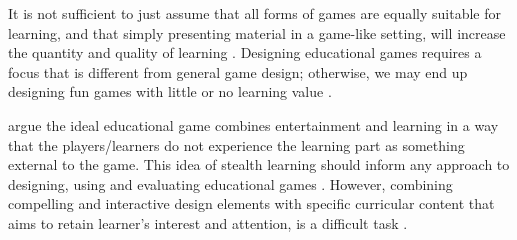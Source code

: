 \documentclass[a4paper,11.5pt]{report}
\numberwithin{figure}{section}
\numberwithin{table}{section}
\numberwithin{equation}{section}
\numberwithin{equation}{section}
\begin{document}

It is not sufficient to just assume that all forms of games are equally suitable for learning, and that simply presenting material in a game-like setting, will increase the quantity and quality of learning \citep{Breuer2010}. Designing educational games requires a focus that is different from general game design; otherwise, we may end up designing fun games with little or no learning value \citep{Barnes2007}.

\citet{Breuer2010} argue the ideal educational game combines entertainment and learning in a way that the players/learners do not experience the learning part as something external to the game. This idea of stealth learning should inform any approach to designing, using and evaluating educational games \citep{Breuer2010}. However, combining compelling and interactive design elements with specific curricular content that aims to retain learner's interest and attention, is a difficult task \citep{prensky2003}. 







\end{document}

